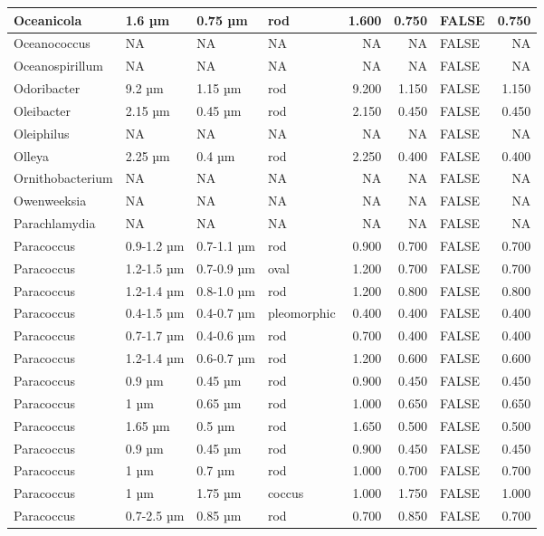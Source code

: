 \documentclass[
]{article}
\begin{document}
\begin{table}
\begin{tabular}{l|l|l|l|r|r|l|r}
\hline
Oceanicola & 1.6 µm & 0.75 µm & rod & 1.600 & 0.750 & FALSE & 0.750\\
\hline
Oceanococcus & NA & NA & NA & NA & NA & FALSE & NA\\
\hline
Oceanospirillum & NA & NA & NA & NA & NA & FALSE & NA\\
\hline
Odoribacter & 9.2 µm & 1.15 µm & rod & 9.200 & 1.150 & FALSE & 1.150\\
\hline
Oleibacter & 2.15 µm & 0.45 µm & rod & 2.150 & 0.450 & FALSE & 0.450\\
\hline
Oleiphilus & NA & NA & NA & NA & NA & FALSE & NA\\
\hline
Olleya & 2.25 µm & 0.4 µm & rod & 2.250 & 0.400 & FALSE & 0.400\\
\hline
Ornithobacterium & NA & NA & NA & NA & NA & FALSE & NA\\
\hline
Owenweeksia & NA & NA & NA & NA & NA & FALSE & NA\\
\hline
Parachlamydia & NA & NA & NA & NA & NA & FALSE & NA\\
\hline
Paracoccus & 0.9-1.2 µm & 0.7-1.1 µm & rod & 0.900 & 0.700 & FALSE & 0.700\\
\hline
Paracoccus & 1.2-1.5 µm & 0.7-0.9 µm & oval & 1.200 & 0.700 & FALSE & 0.700\\
\hline
Paracoccus & 1.2-1.4 µm & 0.8-1.0 µm & rod & 1.200 & 0.800 & FALSE & 0.800\\
\hline
Paracoccus & 0.4-1.5 µm & 0.4-0.7 µm & pleomorphic & 0.400 & 0.400 & FALSE & 0.400\\
\hline
Paracoccus & 0.7-1.7 µm & 0.4-0.6 µm & rod & 0.700 & 0.400 & FALSE & 0.400\\
\hline
Paracoccus & 1.2-1.4 µm & 0.6-0.7 µm & rod & 1.200 & 0.600 & FALSE & 0.600\\
\hline
Paracoccus & 0.9 µm & 0.45 µm & rod & 0.900 & 0.450 & FALSE & 0.450\\
\hline
Paracoccus & 1 µm & 0.65 µm & rod & 1.000 & 0.650 & FALSE & 0.650\\
\hline
Paracoccus & 1.65 µm & 0.5 µm & rod & 1.650 & 0.500 & FALSE & 0.500\\
\hline
Paracoccus & 0.9 µm & 0.45 µm & rod & 0.900 & 0.450 & FALSE & 0.450\\
\hline
Paracoccus & 1 µm & 0.7 µm & rod & 1.000 & 0.700 & FALSE & 0.700\\
\hline
Paracoccus & 1 µm & 1.75 µm & coccus & 1.000 & 1.750 & FALSE & 1.000\\
\hline
Paracoccus & 0.7-2.5 µm & 0.85 µm & rod & 0.700 & 0.850 & FALSE & 0.700\\

\end{tabular}
\end{table}
\end{document}
